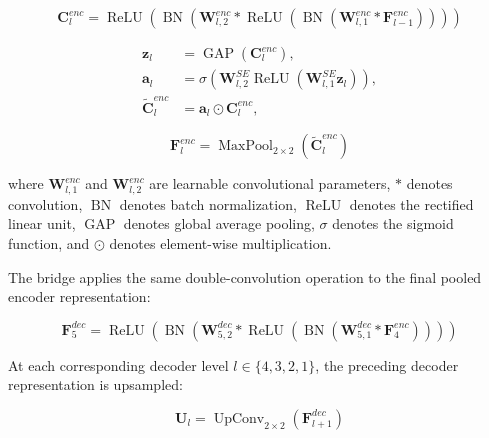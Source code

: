 \documentclass[sigconf]{acmart}
\begin{document}
\begin{equation}
\mathbf{C}^{enc}_{l} = \operatorname{ReLU}\left(
  \operatorname{BN}\left(
    \mathbf{W}_{l,2}^{enc} * \operatorname{ReLU}\left(
      \operatorname{BN}\left(
        \mathbf{W}_{l,1}^{enc} * \mathbf{F}^{enc}_{l-1}
      \right)
    \right)
  \right)
\right)
\label{eq:doubleconv}
\end{equation}

\begin{equation}
\begin{aligned}
\mathbf{z}_l &= \operatorname{GAP}(\mathbf{C}^{enc}_l),\\
\mathbf{a}_l &= \sigma\left(
\mathbf{W}^{SE}_{l,2}
\operatorname{ReLU}\left(
\mathbf{W}^{SE}_{l,1}\mathbf{z}_l
\right)\right),\\
\widetilde{\mathbf{C}}^{enc}_l
&= \mathbf{a}_l \odot \mathbf{C}^{enc}_l,
\end{aligned}
\label{eq:se}
\end{equation}

\begin{equation}
\mathbf{F}^{enc}_{l} =
\operatorname{MaxPool}_{2\times2}
\left(\widetilde{\mathbf{C}}^{enc}_{l}\right)
\label{eq:maxpool}
\end{equation}

where $\mathbf{W}_{l,1}^{enc}$ and $\mathbf{W}_{l,2}^{enc}$ are
learnable convolutional parameters, $*$ denotes convolution,
$\operatorname{BN}$ denotes batch normalization, $\operatorname{ReLU}$ denotes the rectified linear unit, 
$\operatorname{GAP}$ denotes global average pooling, $\sigma$ denotes the sigmoid function, and $\odot$ 
denotes element-wise multiplication. 

The bridge applies the same double-convolution operation to
the final pooled encoder representation:

\begin{equation}
\mathbf{F}^{dec}_{5} =
\operatorname{ReLU}\left(
  \operatorname{BN}\left(
    \mathbf{W}_{5,2}^{dec} * \operatorname{ReLU}\left(
      \operatorname{BN}\left(
        \mathbf{W}_{5,1}^{dec} * \mathbf{F}^{enc}_{4}
      \right)
    \right)
  \right)
\right)
\label{eq:bridge}
\end{equation}

At each corresponding decoder level $l\in\{4,3,2,1\}$,
the preceding decoder representation is upsampled:

\begin{equation}
\mathbf{U}_{l} =
\operatorname{UpConv}_{2 \times 2}
\left(\mathbf{F}^{dec}_{l+1}\right)
\label{eq:upconv}
\end{equation}
\end{document}
